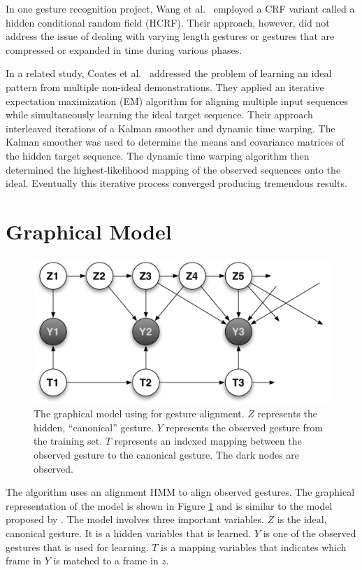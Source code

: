 \documentclass{article}
\begin{document}
In one gesture recognition project, Wang et al.\ \cite{Wang2006} employed a
CRF variant called a hidden conditional random field (HCRF). Their approach,
however, did not address the issue of dealing with varying length gestures or
gestures that are compressed or expanded in time during various phases.

In a related study, Coates et al.\ \cite{Coates2008} addressed the problem of
learning an ideal pattern from multiple non-ideal demonstrations. They applied
an iterative expectation maximization (EM) algorithm for aligning multiple input
sequences while simultaneously learning the ideal target sequence. Their
approach interleaved iterations of a Kalman smoother and dynamic time warping.
The Kalman smoother \cite{Muphy2002} was used to determine the means and
covariance matrices of the hidden target sequence. The dynamic time warping
algorithm \cite{Listgarten2005} then determined the highest-likelihood mapping
of the observed sequences onto the ideal. Eventually this iterative process
converged producing tremendous results.

\section{Graphical Model}

\begin{figure}
\begin{centering}
\includegraphics[width=0.65\columnwidth]{figures/model_tau_unobserved.pdf}

\caption{The graphical model using for gesture alignment. $Z$ represents the
hidden, ``canonical'' gesture. $Y$ represents the observed gesture from the
training set. $T$ represents an indexed mapping between the observed gesture
to the canonical gesture. The dark nodes are observed.
\label{figure:model_tau_unobserved}}

\end{centering}
\end{figure}


The algorithm uses an alignment HMM to align observed gestures. The graphical
representation of the model is shown in Figure
\ref{figure:model_tau_unobserved} and is similar to the model proposed by
\cite{Coates2008}. The model involves three important variables. $Z$ is the
ideal, canonical gesture. It is a hidden variables that is learned. $Y$ is one
of the observed gestures that is used for learning. $T$ is a mapping variables
that indicates which frame in $Y$ is matched to a frame in $z$.
\end{document}
